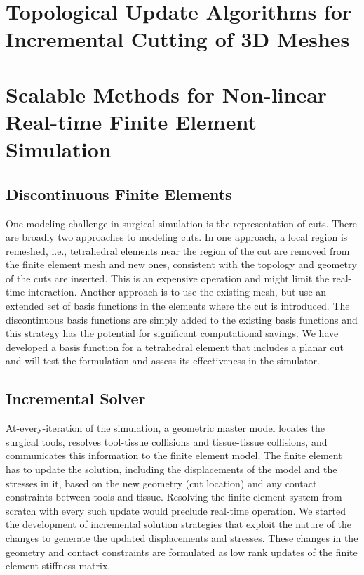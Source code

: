 
\section{Topological Update Algorithms for Incremental Cutting of 3D Meshes}\label{sec:topological_updates}

\section{Scalable Methods for Non-linear Real-time Finite Element Simulation}\label{sec:fem_simulation}

\subsection{Discontinuous Finite Elements}\label{ssec:discontinuous_fem}
One modeling challenge in surgical simulation is the representation of cuts. There are broadly two approaches to modeling cuts. In one approach, a local region is remeshed, i.e., tetrahedral elements near the region of the cut are removed from the finite element mesh and new ones, consistent with the topology and geometry of the cuts are inserted. This is an expensive operation and might limit the real-time interaction. Another approach is to use the existing mesh, but use an extended set of basis functions in the elements where the cut is introduced. The discontinuous basis functions are simply added to the existing basis functions and this strategy has the potential for significant computational savings. We have developed a basis function for a tetrahedral element that includes a planar cut and will test the formulation and assess its effectiveness in the simulator.

\subsection{Incremental Solver}\label{ssec:incremental_solver}
At-every-iteration of the simulation, a geometric master model locates the surgical tools, resolves tool-tissue collisions and tissue-tissue collisions, and communicates this information to the finite element model. The finite element has to update the solution, including the displacements of the model and the stresses in it, based on the new geometry (cut location) and any contact constraints between tools and tissue. Resolving the finite element system from scratch with every such update would preclude real-time operation. We started the development of incremental solution strategies that exploit the nature of the changes to generate the updated displacements and stresses. These changes in the geometry and contact constraints are formulated as low rank updates of the finite element stiffness matrix.

